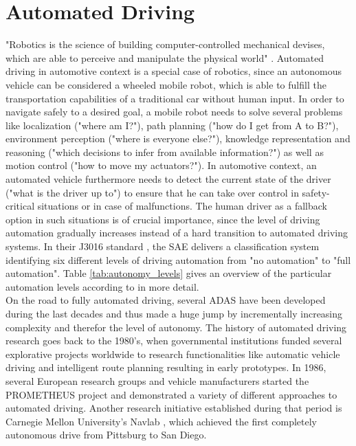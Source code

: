 \section{Automated Driving}
"Robotics is the science of building computer-controlled mechanical devises, which are able to perceive and manipulate the physical world" \cite{Thrun2005}.
Automated driving in automotive context is a special case of robotics, since an autonomous vehicle can be considered a wheeled mobile robot, which is able to fulfill the transportation capabilities of a traditional car without human input. 
In order to navigate safely to a desired goal, a mobile robot needs to solve several problems like localization ("where am I?"), path planning ("how do I get from A to B?"), environment perception ("where is everyone else?"), knowledge representation and reasoning ("which decisions to infer from available information?") as well as motion control ("how to move my actuators?").
In automotive context, an automated vehicle furthermore needs to detect the current state of the driver ("what is the driver up to") to ensure that he can take over control in safety-critical situations or in case of malfunctions.
The human driver as a fallback option in such situations is of crucial importance, since the level of driving automation gradually increases instead of a hard transition to automated driving systems.
In their J3016 standard \cite{SAE_J3016}, the \ac{SAE} delivers a classification system identifying six different levels of driving automation from "no automation" to "full automation".
Table \ref{tab:autonomy_levels} gives an overview of the particular automation levels according to \cite{SAE_J3016} in more detail.\\
On the road to fully automated driving, several \ac{ADAS} have been developed during the last decades and thus made a huge jump by incrementally increasing complexity and therefor the level of autonomy.
The history of automated driving research goes back to the 1980's, when governmental institutions funded several explorative projects worldwide to research functionalities like automatic vehicle driving and intelligent route planning resulting in early prototypes.
In 1986, several European research groups and vehicle manufacturers started the \ac{PROMETHEUS} project \cite{Dickmanns1990} and demonstrated a variety of different approaches to automated driving.
Another research initiative established during that period is Carnegie Mellon University's Navlab \cite{Thorpe1988}, which achieved the first completely autonomous drive from Pittsburg to San Diego.

